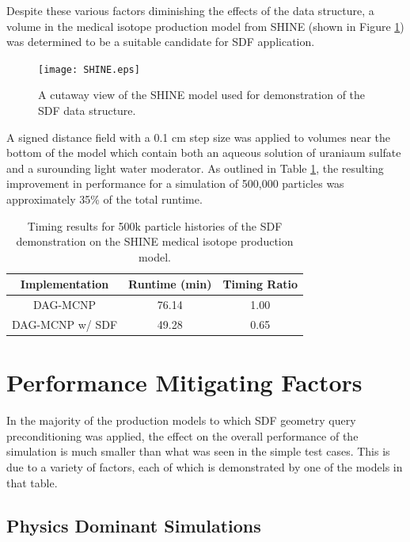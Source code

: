 Despite these various factors diminishing the effects of the data structure, a
volume in the medical isotope production model from SHINE (shown in Figure
\ref{fig:shine_sdf}) was determined to be a suitable candidate for SDF
application.

\begin{figure}
\centering
\texttt{[image: SHINE.eps]}
\caption{A cutaway view of the SHINE model used for demonstration of the SDF
  data structure.}
\label{fig:shine_sdf}
\end{figure}

A signed distance field with a 0.1 cm step size was applied to volumes near the
bottom of the model which contain both an aqueous solution of uraniaum sulfate
and a surounding light water moderator. As outlined in Table
\ref{tab:shine_sdf_result}, the resulting improvement in performance for a
simulation of 500,000 particles was approximately 35\% of the total runtime.

\begin{table}[H]
\centering
\begin{tabular}{c c c}
  \toprule
  \textbf{Implementation} & \textbf{Runtime (min)} & \textbf{Timing Ratio} \\
  \hline
  DAG-MCNP                & 76.14                  & 1.00                  \\
  DAG-MCNP w/ SDF         & 49.28                  & 0.65                  \\
  \bottomrule
\end{tabular}
\caption{Timing results for 500k particle histories of the SDF demonstration on
  the SHINE medical isotope production model.}
\label{tab:shine_sdf_result}
\end{table}

\section{Performance Mitigating Factors}\label{sec:sdf_limitations}

In the majority of the production models to which SDF geometry query
preconditioning was applied, the effect on the overall performance of the
simulation is much smaller than what was seen in the simple test cases. This is
due to a variety of factors, each of which is demonstrated by one of the models
in that table.

\subsection{Physics Dominant Simulations}\label{subsec:sdf_phys_dominant}


